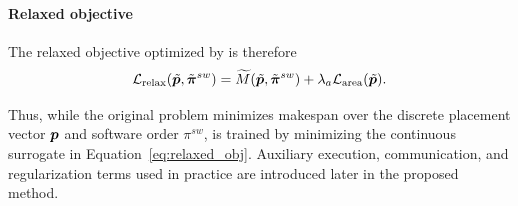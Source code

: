 \paragraph{\textbf{Relaxed objective}}
The relaxed objective optimized by \diffgnn is therefore
\begin{equation}
\mathcal{L}_{\mathrm{relax}}(\tilde{{\bm{p}}},\tilde{\bm{\pi}}^{sw})
=
\widetilde{M}(\tilde{{\bm{p}}},\tilde{\bm{\pi}}^{sw})
+
\lambda_a \mathcal{L}_{\mathrm{area}}(\tilde{{\bm{p}}}).
\label{eq:relaxed_obj}
\end{equation}

Thus, while the original problem minimizes makespan over the discrete placement vector ${\bm{p}}$ and software order $\pi^{sw}$, \diffgnn is trained by minimizing the continuous surrogate in Equation~\eqref{eq:relaxed_obj}. Auxiliary execution, communication, and regularization terms used in practice are introduced later in the proposed method.
